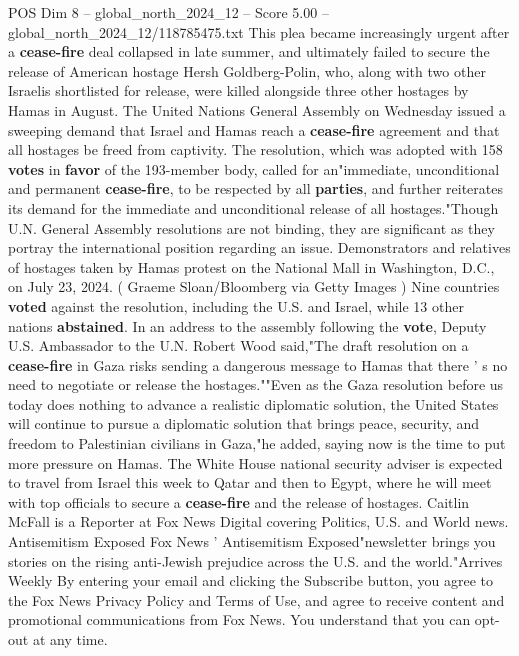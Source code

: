 \begin{textsample}{POS Dim 8 – global\_north\_2024\_12 – Score 5.00 – global\_north\_2024\_12/118785475.txt}
This plea became increasingly urgent after a \textbf{cease-fire} deal collapsed in late summer, and ultimately failed to secure the release of American hostage Hersh Goldberg-Polin, who, along with two other Israelis shortlisted for release, were killed alongside three other hostages by Hamas in August.
The United Nations General Assembly on Wednesday issued a sweeping demand that Israel and Hamas reach a \textbf{cease-fire} agreement and that all hostages be freed from captivity.
The resolution, which was adopted with 158 \textbf{votes} in \textbf{favor} of the 193-member body, called for an"immediate, unconditional and permanent \textbf{cease-fire}, to be respected by all \textbf{parties}, and further reiterates its demand for the immediate and unconditional release of all hostages."Though U.N.
General Assembly resolutions are not binding, they are significant as they portray the international position regarding an issue.
Demonstrators and relatives of hostages taken by Hamas protest on the National Mall in Washington, D.C., on July 23, 2024. ( Graeme Sloan/Bloomberg via Getty Images ) Nine countries \textbf{voted} against the resolution, including the U.S. and Israel, while 13 other nations \textbf{abstained}.
In an address to the assembly following the \textbf{vote}, Deputy U.S.
Ambassador to the U.N.
Robert Wood said,"The draft resolution on a \textbf{cease-fire} in Gaza risks sending a dangerous message to Hamas that there ' s no need to negotiate or release the hostages.""Even as the Gaza resolution before us today does nothing to advance a realistic diplomatic solution, the United States will continue to pursue a diplomatic solution that brings peace, security, and freedom to Palestinian civilians in Gaza,"he added, saying now is the time to put more pressure on Hamas.
The White House national security adviser is expected to travel from Israel this week to Qatar and then to Egypt, where he will meet with top officials to secure a \textbf{cease-fire} and the release of hostages.
Caitlin McFall is a Reporter at Fox News Digital covering Politics, U.S. and World news.
Antisemitism Exposed Fox News ' Antisemitism Exposed"newsletter brings you stories on the rising anti-Jewish prejudice across the U.S. and the world."Arrives Weekly By entering your email and clicking the Subscribe button, you agree to the Fox News Privacy Policy and Terms of Use, and agree to receive content and promotional communications from Fox News.
You understand that you can opt-out at any time.

\end{textsample}
